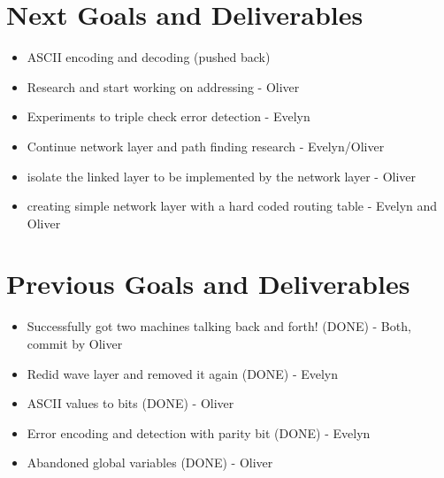 \documentclass{article}
\begin{document}
\section*{Next Goals and Deliverables}
\begin{itemize}
\item ASCII encoding and decoding (pushed back)
\item Research and start working on addressing - Oliver
\item Experiments to triple check error detection - Evelyn
\item Continue network layer and path finding research - Evelyn/Oliver
\item isolate the linked layer to be implemented by the network layer - Oliver
\item creating simple network layer with a hard coded routing table - Evelyn and Oliver
\end{itemize}
\section*{Previous Goals and Deliverables}
\begin{itemize}
\item Successfully got two machines talking back and forth! (DONE) - Both, commit by Oliver
\item Redid wave layer and removed it again (DONE) - Evelyn
\item ASCII values to bits (DONE) - Oliver
\item Error encoding and detection with parity bit (DONE) - Evelyn
\item Abandoned global variables (DONE) - Oliver
\end{itemize}
\end{document}
